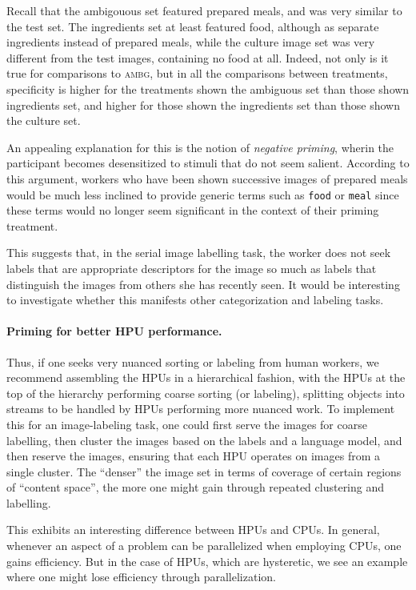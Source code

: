 \documentclass[a4paper]{report}
\begin{document}
Recall that the ambigouous set featured prepared meals, and 
was very similar to the test set.  The ingredients set at least featured 
food, although as separate ingredients instead of prepared meals, while the
culture image set was very different from the test images, containing no food
at all.
Indeed, not only is it true for comparisons to \textsc{ambg}, but in all the 
comparisons between treatments, specificity is higher for the 
treatments shown the ambiguous set than those shown ingredients set, 
and higher for those shown the ingredients set than those shown the culture 
set.

An appealing explanation for 
this is the notion of \textit{negative priming}, wherin the participant
becomes desensitized to stimuli that do not seem salient.  According to this 
argument, workers who have been shown successive images of prepared meals 
would be much less inclined to provide generic terms such as \texttt{food} or 
\texttt{meal} since these terms would no longer seem significant in the 
context of their priming treatment.  

This suggests that, in the serial image labelling task, the worker
does not seek labels that are appropriate descriptors for the image so much 
as labels that distinguish the images from others she has recently seen.
It would be interesting to investigate whether this manifests other 
categorization and labeling tasks.

\paragraph{Priming for better HPU performance.}
Thus, if one seeks very nuanced sorting or labeling from human workers, 
we recommend assembling the HPUs in a hierarchical fashion, with the 
HPUs at the top of the hierarchy performing coarse sorting (or labeling), 
splitting objects into streams to be handled by HPUs performing more nuanced 
work.  To implement this for an
image-labeling task, one could first serve the images for coarse labelling,
then cluster the images based on the labels and a language model, and then 
reserve the images, ensuring that each HPU operates on images from a single 
cluster.  The ``denser'' the image set in terms of coverage of certain
regions of ``content space'', the more one might gain through repeated 
clustering and labelling.

This exhibits an interesting difference between HPUs and CPUs.  In general,
whenever an aspect of a problem can be parallelized when employing CPUs, one
gains efficiency.  But in the case of HPUs, which are hysteretic, we see an 
example where one might lose efficiency through parallelization.
\end{document}

